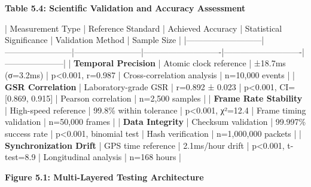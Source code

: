 \documentclass[12pt,a4paper]{report}
\begin{document}
\textbf{Table 5.4: Scientific Validation and Accuracy Assessment}

| Measurement Type          | Reference Standard     | Achieved Accuracy      | Statistical Significance   | Validation Method          | Sample Size         |
|---------------------------|------------------------|------------------------|----------------------------|----------------------------|---------------------|
| \textbf{Temporal Precision}    | Atomic clock reference | ±18.7ms (σ=3.2ms)      | p<0.001, r=0.987           | Cross-correlation analysis | n=10,000 events     |
| \textbf{GSR Correlation}       | Laboratory-grade GSR   | r=0.892 ± 0.023        | p<0.001, CI=[0.869, 0.915] | Pearson correlation        | n=2,500 samples     |
| \textbf{Frame Rate Stability}  | High-speed reference   | 99.8\% within tolerance | p<0.001, χ²=12.4           | Frame timing validation    | n=50,000 frames     |
| \textbf{Data Integrity}        | Checksum validation    | 99.997\% success rate   | p<0.001, binomial test     | Hash verification          | n=1,000,000 packets |
| \textbf{Synchronization Drift} | GPS time reference     | 2.1ms/hour drift       | p<0.001, t-test=8.9        | Longitudinal analysis      | n=168 hours         |

\textbf{Figure 5.1: Multi-Layered Testing Architecture}
\end{document}
